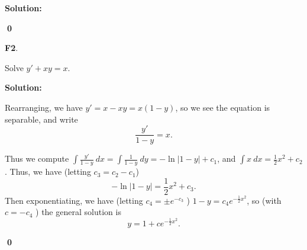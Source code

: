 \documentclass{article}
\newenvironment{problem}[1]
{
  \begin{flushleft}
  \textbf{#1}.
  \ignorespaces
}
{
  \end{flushleft}
}
\newenvironment{solution}
{
  \ignorespaces
  \textbf{Solution:}
}
{
  \ignorespacesafterend
  \begin{flushright}
  {\bfseries \qed}
  \end{flushright}
}
\begin{document}
\begin{solution}

\begin{center}\end{center}
\end{solution}


\begin{problem}{F2}
Solve \(y'+xy=x\).
\end{problem}
\begin{solution}
Rearranging, we have \(y'=x-xy=x(1-y)\), so we see the equation is separable, and write
\[ \frac{y'}{1-y} = x .\]

Thus we compute \(\int \frac{y'}{1-y}\ dx = \int \frac{1}{1-y}\ dy = -\ln|1-y|+c_1\), and \(\int x\ dx = \frac{1}{2}x^2+c_2\).  
Thus, we have (letting \(c_3=c_2-c_1\)) \[-\ln|1-y|=\frac{1}{2}x^2+c_3.\]
Then exponentiating, we have (letting \(c_4=\pm e^{-c_3}\) ) \(1-y=c_4e^{-\frac{1}{2}x^2}\), so (with \(c=-c_4\) ) the general solution is   \[y=1+c e^{-\frac{1}{2}x^2}.\]
\end{solution}
\end{document}
